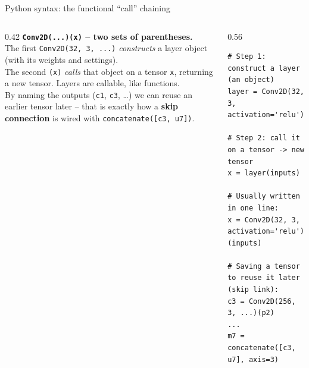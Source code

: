 \documentclass[10pt,aspectratio=169]{beamer}
\renewcommand{\section}[2][]{}
\begin{document}
\begin{frame}[fragile]{Python syntax: the functional ``call'' chaining}
\begin{columns}[T,onlytextwidth]
\begin{column}{0.42\textwidth}
\small
\textbf{\texttt{Conv2D(...)(x)} -- two sets of parentheses.}\\[0.4em]
The first \texttt{Conv2D(32, 3, ...)} \emph{constructs} a layer object (with its weights and
settings).\\[0.4em]
The second \texttt{(x)} \emph{calls} that object on a tensor \texttt{x}, returning a new tensor.
Layers are callable, like functions.\\[0.4em]
By naming the outputs (\texttt{c1}, \texttt{c3}, \dots) we can reuse an earlier tensor later --
that is exactly how a \textbf{skip connection} is wired with \texttt{concatenate([c3, u7])}.
\end{column}
\begin{column}{0.56\textwidth}
\begin{lstlisting}[stepnumber=0]
# Step 1: construct a layer (an object)
layer = Conv2D(32, 3, activation='relu')

# Step 2: call it on a tensor -> new tensor
x = layer(inputs)

# Usually written in one line:
x = Conv2D(32, 3, activation='relu')(inputs)

# Saving a tensor to reuse it later (skip link):
c3 = Conv2D(256, 3, ...)(p2)
...
m7 = concatenate([c3, u7], axis=3)
\end{lstlisting}
\end{column}
\end{columns}
\end{frame}

\section{Training}
\end{document}

